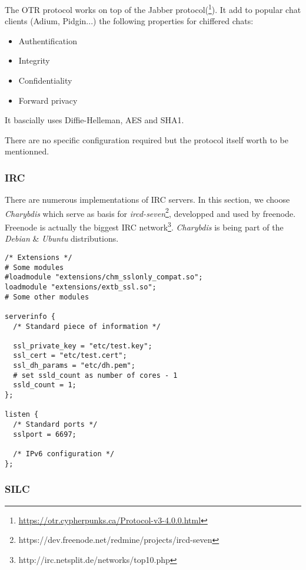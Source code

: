 The OTR protocol works on top of the Jabber protocol(\footnote{\url{https://otr.cypherpunks.ca/Protocol-v3-4.0.0.html}}).  
It add to popular chat clients (Adium, Pidgin...) the following properties for chiffered chats:
\begin{itemize}
    \item Authentification
    \item Integrity
    \item Confidentiality
    \item Forward privacy
\end{itemize}

It bascially uses Diffie-Helleman, AES and SHA1. 

There are no specific configuration required but the protocol itself worth to be mentionned.

\subsubsection{IRC}


There are numerous implementations of IRC servers.  In this section, we choose {\it Charybdis} which serve as basis for {\it ircd-seven}\footnote{https://dev.freenode.net/redmine/projects/ircd-seven}, developped and used by freenode. Freenode is actually the biggest IRC network\footnote{http://irc.netsplit.de/networks/top10.php}.  {\it Charybdis} is being part of the {\it Debian} \& {\it Ubuntu} distributions.

\begin{lstlisting}[breaklines]
/* Extensions */
# Some modules 
#loadmodule "extensions/chm_sslonly_compat.so";
loadmodule "extensions/extb_ssl.so";
# Some other modules

serverinfo {
  /* Standard piece of information */
  
  ssl_private_key = "etc/test.key";
  ssl_cert = "etc/test.cert";
  ssl_dh_params = "etc/dh.pem";
  # set ssld_count as number of cores - 1
  ssld_count = 1; 
};

listen {
  /* Standard ports */
  sslport = 6697;

  /* IPv6 configuration */
};
\end{lstlisting}


\subsubsection{SILC}



